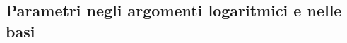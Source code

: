 \subsection{Parametri negli argomenti logaritmici e nelle basi}
\label{sec:esercizi-serie-parametri-in-logaritmi-e-basi}
